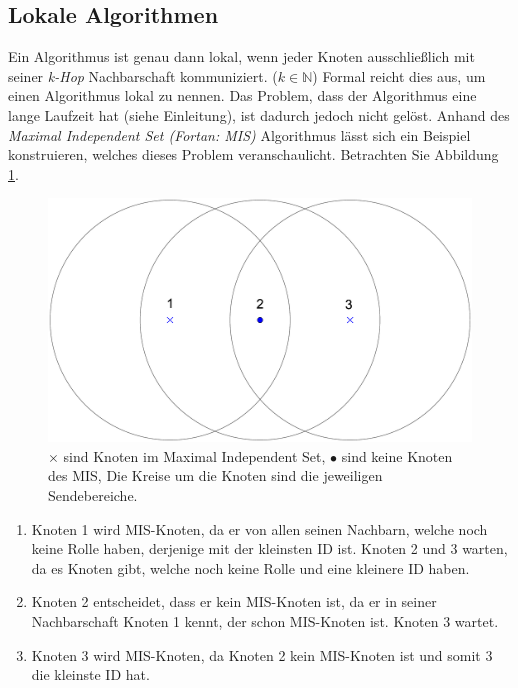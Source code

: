 \documentclass[a4paper,twoside]{IEEEtran}
\begin{document}
\subsection{Lokale Algorithmen} \label{lokal}
Ein Algorithmus ist genau dann lokal, wenn jeder Knoten ausschließlich mit seiner \textit{k-Hop} Nachbarschaft kommuniziert. ($k \in \mathds{N}$)
Formal reicht dies aus, um einen Algorithmus lokal zu nennen.
Das Problem, dass der Algorithmus eine lange Laufzeit hat (siehe Einleitung), ist dadurch jedoch nicht gelöst.
Anhand des \textit{Maximal Independent Set (Fortan: MIS)} Algorithmus lässt sich ein Beispiel konstruieren, welches dieses Problem veranschaulicht.
Betrachten Sie Abbildung \ref{fig:MIS}.

\begin{figure}[h!]
\centering
\includegraphics[width=0.99\linewidth]{MIS.eps}
\caption{$\times $ sind Knoten im Maximal Independent Set, $\bullet $ sind keine Knoten des MIS, Die Kreise um die Knoten sind die jeweiligen Sendebereiche.}
\label{fig:MIS}
\end{figure}


\begin{enumerate}
\item[Runde 1] Knoten 1 wird MIS-Knoten, da er von allen seinen Nachbarn, welche noch keine Rolle haben, derjenige mit der kleinsten ID ist. Knoten 2 und 3 warten, da es Knoten gibt, welche noch keine Rolle und eine kleinere ID haben.

\item[Runde 2] Knoten 2 entscheidet, dass er kein MIS-Knoten ist, da er in seiner Nachbarschaft Knoten 1 kennt, der schon MIS-Knoten ist. Knoten 3 wartet.

\item[Runde 3] Knoten 3 wird MIS-Knoten, da Knoten 2 kein MIS-Knoten ist und somit 3 die kleinste ID hat. 
\end{enumerate}
\end{document}
